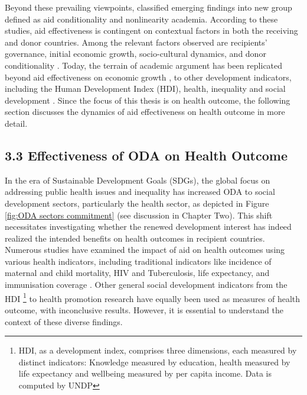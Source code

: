 Beyond these prevailing viewpoints, \textcite{yontcheva_macroeconomic_2006} classified emerging findings into new group defined as aid conditionality and nonlinearity academia. According to these studies, aid effectiveness is contingent on contextual factors in both the receiving and donor countries. Among the relevant factors observed are recipients' governance, initial economic growth, socio-cultural dynamics, and donor conditionality \parencite{yontcheva_macroeconomic_2006, abate_relationship_2022, nwude_impact_2023, temple_aid_2010}. Today, the terrain of academic argument has been replicated beyond aid effectiveness on economic growth \parencite[see][]{yontcheva_macroeconomic_2006, temple_aid_2010}, to other development indicators, including the Human Development Index (HDI), health, inequality and social development \parencite[i.e.][]{aluko_analysis_2021, habtetsion_impact_2017, shafiullah_foreign_2011}. Since the focus of this thesis is on health outcome, the following section discusses the dynamics of aid effectiveness on health outcome in more detail.


\subsection*{3.3 Effectiveness of ODA on Health Outcome}
In the era of Sustainable Development Goals (SDGs), the global focus on addressing public health issues and inequality has increased ODA to social development sectors, particularly the health sector, as depicted in Figure \ref{fig:ODA sectors commitment} (see discussion in Chapter Two). This shift necessitates investigating whether the renewed development interest has indeed realized the intended benefits on health outcomes in recipient countries. Numerous studies have examined the impact of aid on health outcomes using various health indicators, including traditional indicators like incidence of maternal and child mortality, HIV and Tuberculosis, life expectancy, and immunisation coverage \parencite{nwude_official_2020, yan_mortality_2015, doucouliagos_health_2021, kavakli_us_2022, williamson_foreign_2008}. Other general social development indicators from the HDI \footnote{HDI, as a development index, comprises three dimensions, each measured by distinct indicators: Knowledge measured by education, health measured by life expectancy and wellbeing measured by per capita income. Data is computed by UNDP} \parencite{kavanagh_governance_2019, chung_economic_2022, mohamed_foreign_2017} to health promotion research \parencite{cassola_evaluating_2022} have equally been used as measures of health outcome, with inconclusive results. However, it is essential to understand the context of these diverse findings.


